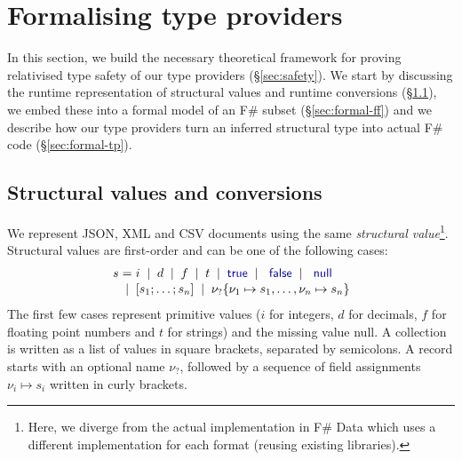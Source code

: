 \documentclass[10pt,preprint,clearpagebib]{sigplanconf}
\newcommand{\kvd}[1]{\textnormal{\textcolor{kvdclr}{\sffamily #1}}}
\newcommand{\lsep}[0]{\;\; | \;\;}
\newcommand{\narrow}[1]{\hspace{-0.7em} #1 \hspace{-0.7em}}
\begin{document}
% 
%

\section{Formalising type providers}
\label{sec:formal}

In this section, we build the necessary theoretical framework for proving relativised type safety 
of our type providers (\S\ref{sec:safety}). We start by discussing the runtime representation of 
structural values and runtime conversions (\S\ref{sec:formal-convert}), we embed these into a 
formal model of an F\# subset (\S\ref{sec:formal-ff}) and we describe how our type providers 
turn an inferred structural type into actual F\# code (\S\ref{sec:formal-tp}).


\subsection{Structural values and conversions}
\label{sec:formal-convert}

We represent JSON, XML and CSV documents using the same \emph{structural value}\footnote{Here, we 
diverge from the actual implementation in F\# Data which uses a different implementation for each 
format (reusing existing libraries).}. Structural values are first-order and can be one of the 
following cases:
%
\begin{equation*}
\begin{array}{lcl}
 s &\narrow{=}& i \lsep d \lsep f \lsep t \lsep \kvd{true} \lsep \kvd{false} \lsep \kvd{null} \\[0.1em]
   &\narrow{|}& [s_1; \ldots; s_n] \lsep \nu_?\{ \nu_1 \mapsto s_1, \ldots, \nu_n \mapsto s_n \}
\end{array}
\end{equation*}
%
The first few cases represent primitive values ($i$ for integers, $d$ for decimals, $f$ for floating
point numbers and $t$ for strings) and the missing value \kvd{null}. A collection is written as a 
list of values in square brackets, separated by semicolons. A record starts with an optional name 
$\nu_?$, followed by a sequence of field assignments $\nu_i \mapsto s_i$ written in curly brackets.
\end{document}
